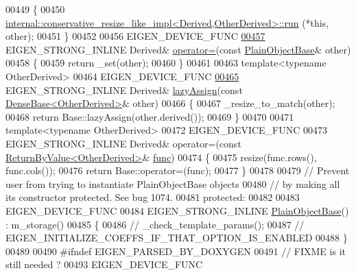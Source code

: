 \begin{DoxyCode}
00449     \{
00450       \hyperlink{struct_eigen_1_1internal_1_1conservative__resize__like__impl}{internal::conservative\_resize\_like\_impl<Derived,OtherDerived>::run}
      (*\textcolor{keyword}{this}, other);
00451     \}
00452 
00456     EIGEN\_DEVICE\_FUNC
\hyperlink{class_eigen_1_1_plain_object_base_a75308f8a23a03f045a1260611e2054a0}{00457}     EIGEN\_STRONG\_INLINE Derived& \hyperlink{class_eigen_1_1_plain_object_base_a75308f8a23a03f045a1260611e2054a0}{operator=}(\textcolor{keyword}{const} \hyperlink{class_eigen_1_1_plain_object_base}{PlainObjectBase}& other)
00458     \{
00459       \textcolor{keywordflow}{return} \_set(other);
00460     \}
00461 
00463     \textcolor{keyword}{template}<\textcolor{keyword}{typename} OtherDerived>
00464     EIGEN\_DEVICE\_FUNC
\hyperlink{class_eigen_1_1_plain_object_base_a6008cee3b716d514b3e14c1bc7c0d34a}{00465}     EIGEN\_STRONG\_INLINE Derived& \hyperlink{class_eigen_1_1_plain_object_base_a6008cee3b716d514b3e14c1bc7c0d34a}{lazyAssign}(\textcolor{keyword}{const} 
      \hyperlink{group___core___module_class_eigen_1_1_dense_base}{DenseBase<OtherDerived>}& other)
00466     \{
00467       \_resize\_to\_match(other);
00468       \textcolor{keywordflow}{return} Base::lazyAssign(other.derived());
00469     \}
00470 
00471     \textcolor{keyword}{template}<\textcolor{keyword}{typename} OtherDerived>
00472     EIGEN\_DEVICE\_FUNC
00473     EIGEN\_STRONG\_INLINE Derived& operator=(\textcolor{keyword}{const} \hyperlink{group___core___module_class_eigen_1_1_return_by_value}{ReturnByValue<OtherDerived>}& 
      \hyperlink{structfunc}{func})
00474     \{
00475       resize(func.rows(), func.cols());
00476       \textcolor{keywordflow}{return} Base::operator=(func);
00477     \}
00478 
00479     \textcolor{comment}{// Prevent user from trying to instantiate PlainObjectBase objects}
00480     \textcolor{comment}{// by making all its constructor protected. See bug 1074.}
00481   \textcolor{keyword}{protected}:
00482 
00483     EIGEN\_DEVICE\_FUNC
00484     EIGEN\_STRONG\_INLINE \hyperlink{class_eigen_1_1_plain_object_base}{PlainObjectBase}() : m\_storage()
00485     \{
00486 \textcolor{comment}{//       \_check\_template\_params();}
00487 \textcolor{comment}{//       EIGEN\_INITIALIZE\_COEFFS\_IF\_THAT\_OPTION\_IS\_ENABLED}
00488     \}
00489 
00490 \textcolor{preprocessor}{#ifndef EIGEN\_PARSED\_BY\_DOXYGEN}
00491     \textcolor{comment}{// FIXME is it still needed ?}
00493 \textcolor{comment}{}    EIGEN\_DEVICE\_FUNC

\end{DoxyCode}
